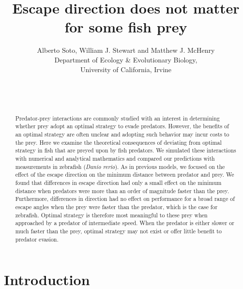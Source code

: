 \documentclass[12pt]{article}
\title{Escape direction does not matter for some fish prey}
\author{Alberto Soto, William J. Stewart and Matthew J. McHenry\\
  Department of Ecology \& Evolutionary Biology,\\
  University of California, Irvine\\ \\ \\ \\}
\begin{document}

\maketitle

\pagebreak


\begin{abstract}

Predator-prey interactions are commonly studied with an interest in determining whether prey adopt an optimal strategy to evade predators. However, the benefits of an optimal strategy are often unclear and adopting such behavior may incur costs to the prey.  
Here we examine the theoretical consequences of deviating from optimal strategy in fish that are preyed upon by fish predators. We simulated these interactions with numerical and analytical mathematics and compared our predictions with measurements in zebrafish (\textit{Danio rerio}). As in previous models, we focused on the effect of the escape direction on the minimum distance between predator and prey.
We found that differences in escape direction had only a small effect on the minimum distance when predators were more than an order of magnitude faster than the prey. Furthermore, differences in direction had no effect on performance for a broad range of escape angles when the prey were faster than the predator, which is the case for zebrafish. 
Optimal strategy is therefore most meaningful to these prey when approached by a predator of intermediate speed.
When the predator is either slower or much faster than the prey, optimal strategy may not exist or offer little benefit to predator evasion. 

\end{abstract}

\pagebreak


\section{Introduction}
\label{intro}
\end{document}
